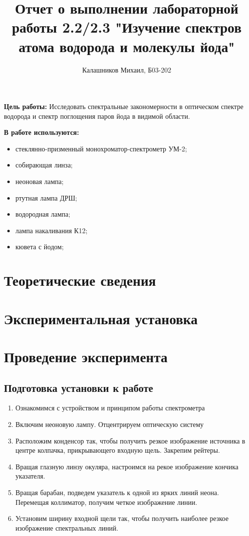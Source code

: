 \documentclass[14pt, a4paper]{report}
\title{\textbf{Отчет о выполнении лабораторной работы 2.2/2.3 "Изучение спектров атома водорода и молекулы йода"}}
\author{Калашников Михаил, Б03-202}
\date{}
\begin{document}
\maketitle

\textbf{Цель работы:}
Исследовать спектральные закономерности в оптическом спектре водорода и спектр поглощения паров йода в видимой области.
\newline


\textbf{В работе используются:}
\begin{itemize}
\item стеклянно-призменный монохроматор-спектрометр УМ-2;
\item собирающая линза;
\item неоновая лампа;
\item ртутная лампа ДРШ;    
\item водородная лампа;
\item лампа накаливания К12;
\item кювета с йодом;
\end{itemize}

\section{Теоретические сведения}

\section{Экспериментальная установка}

\section{Проведение эксперимента}

\subsection{Подготовка установки к работе}

\begin{enumerate}

\setcounter{enumi}{0}

\item Ознакомимся с устройством и принципом работы спектрометра

\item Включим неоновую лампу. Отцентрируем оптическую систему

\item Расположим конденсор так, чтобы получить резкое изображение источника в центре колпачка, прикрывающего входную щель. Закрепим рейтеры.

\item Вращая глазную линзу окуляра, настроимся на рекое изображение кончика указателя.

\item Вращая барабан, подведем указатель к одной из ярких линий неона. Перемещая коллиматор, получим четкое изображение линии.

\item Установим ширину входной щели так, чтобы получить наиболее резкое изображение спектральных линий.

\end{enumerate}
\end{document}
